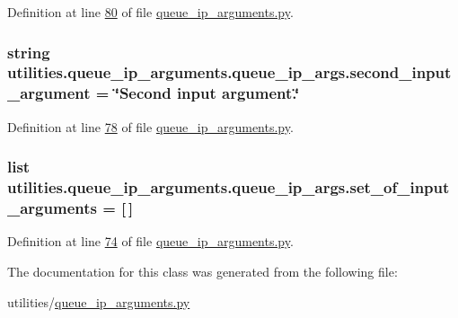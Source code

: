 Definition at line \hyperlink{queue__ip__arguments_8py_source_l00080}{80} of file \hyperlink{queue__ip__arguments_8py_source}{queue\+\_\+ip\+\_\+arguments.\+py}.

\hypertarget{classutilities_1_1queue__ip__arguments_1_1queue__ip__args_a0b179a70c0e57de2794d0d532e534c9c}{}
\subsubsection[{second\+\_\+input\+\_\+argument}]{\setlength{\rightskip}{0pt plus 5cm}string utilities.\+queue\+\_\+ip\+\_\+arguments.\+queue\+\_\+ip\+\_\+args.\+second\+\_\+input\+\_\+argument = \char`\"{}Second input argument.\char`\"{}\hspace{0.3cm}{\ttfamily [static]}}\label{classutilities_1_1queue__ip__arguments_1_1queue__ip__args_a0b179a70c0e57de2794d0d532e534c9c}


Definition at line \hyperlink{queue__ip__arguments_8py_source_l00078}{78} of file \hyperlink{queue__ip__arguments_8py_source}{queue\+\_\+ip\+\_\+arguments.\+py}.

\hypertarget{classutilities_1_1queue__ip__arguments_1_1queue__ip__args_acc8e7685be71a7f95ede7c980355c9f3}{}
\subsubsection[{set\+\_\+of\+\_\+input\+\_\+arguments}]{\setlength{\rightskip}{0pt plus 5cm}list utilities.\+queue\+\_\+ip\+\_\+arguments.\+queue\+\_\+ip\+\_\+args.\+set\+\_\+of\+\_\+input\+\_\+arguments = \mbox{[}$\,$\mbox{]}\hspace{0.3cm}{\ttfamily [static]}}\label{classutilities_1_1queue__ip__arguments_1_1queue__ip__args_acc8e7685be71a7f95ede7c980355c9f3}


Definition at line \hyperlink{queue__ip__arguments_8py_source_l00074}{74} of file \hyperlink{queue__ip__arguments_8py_source}{queue\+\_\+ip\+\_\+arguments.\+py}.



The documentation for this class was generated from the following file\+:\begin{DoxyCompactItemize}
\item 
utilities/\hyperlink{queue__ip__arguments_8py}{queue\+\_\+ip\+\_\+arguments.\+py}\end{DoxyCompactItemize}
